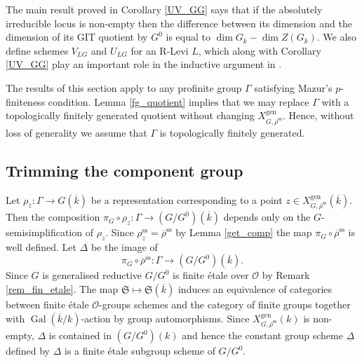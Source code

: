 \documentclass{amsart}
\theoremstyle{definition}
\theoremstyle{remark}
\DeclareMathOperator{\Gal}{Gal}
\newcommand{\OO}{\mathcal O}
\newcommand{\rhobar}{\overline{\rho}}
\newcommand{\gen}{\mathrm{gen}}
\newcommand{\kbar}{\overline{k}}
\newcommand{\rhobarss}{\rhobar^{\mathrm{ss}}}
\begin{document}
The main result proved in Corollary \ref{UV_GG} says that if the absolutely irreducible locus 
is non-empty then the difference between its dimension and the dimension of its GIT quotient by $G^0$ 
is equal to $\dim G_k - \dim Z(G_k)$. We also  define schemes $V_{LG}$ and $U_{LG}$ for an R-Levi $L$, which along with Corollary \ref{UV_GG} play an important role in the inductive argument in 
.

The results of  this section apply to any  profinite group $\Gamma$ satisfying Mazur's $p$-finiteness condition. Lemma \ref{fg_quotient}
implies that we may replace $\Gamma$ with a topologically finitely generated
quotient without changing $X^{\gen}_{G, \rhobarss}$. Hence, without loss of 
generality we assume that $\Gamma$ is topologically finitely generated. 

\subsection{Trimming the component group}\label{sec_trimming} Let $\rho_z: \Gamma \rightarrow G(\kbar)$ be a representation
corresponding to a point $z\in X^{\gen}_{G, \rhobarss}(\kbar)$. Then the composition 
$\pi_G\circ \rho_z: \Gamma \rightarrow (G/G^0)(\kbar)$ depends only on the $G$-semisimplification 
of $\rho_z$. Since $\rho_z^{\mathrm{ss}}=\rhobarss$ by Lemma \ref{get_comp} the map $\pi_G \circ \rhobarss$ 
is well defined. Let $\Delta$ be the image of 
$$\pi_G \circ \rhobarss: \Gamma \rightarrow (G/G^0)(\overline{k}).$$ 
Since $G$ is generalised reductive $G/G^0$ is finite \'etale over $\OO$ by Remark \ref{rem_fin_etale}.
The map $\mathfrak S\mapsto \mathfrak S(\kbar)$ induces an equivalence of categories between finite \'etale $\OO$-groups schemes and the category of finite groups together with 
$\Gal(\overline{k}/k)$-action by group automorphisms. Since $X^{\gen}_{G, \rhobarss}(k)$ is non-empty, 
$\Delta$ is contained in $(G/G^0)(k)$ and hence
the constant group scheme $\underline{\Delta}$ defined by $\Delta$ is a finite \'etale subgroup scheme
of $G/G^0$.

 
\end{document}
